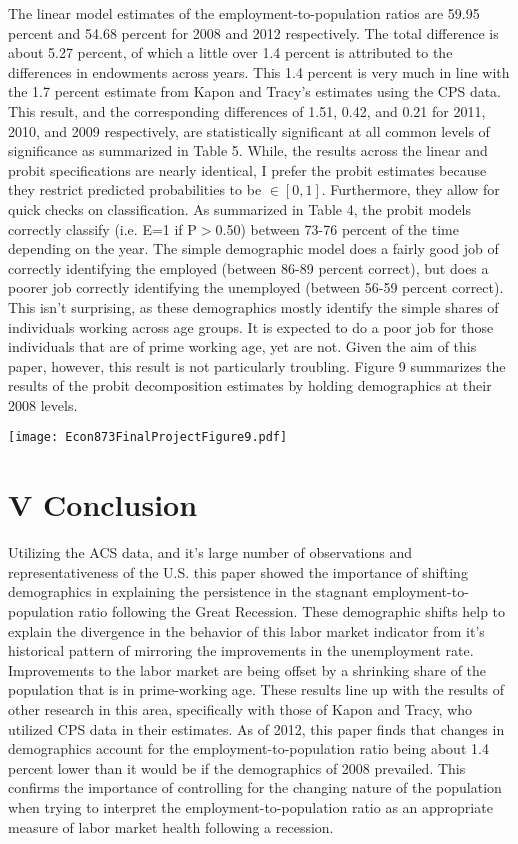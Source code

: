 \documentclass[11pt]{article}
\theoremstyle{definition}
\begin{document}
The linear model estimates of the employment-to-population ratios are 59.95 percent and 54.68 percent for 2008 and 2012 respectively.  The total difference is about 5.27 percent, of which a little over 1.4 percent is attributed to the differences in endowments across years.  This 1.4 percent is very much in line with the 1.7 percent estimate from Kapon and Tracy's estimates using the CPS data.  This result, and the corresponding differences of 1.51, 0.42, and 0.21 for 2011, 2010, and 2009 respectively, are statistically significant at all common levels of significance as summarized in Table 5.  While, the results across the linear and probit specifications are nearly identical, I prefer the probit estimates because they restrict predicted probabilities to be $\in[0,1]$.  Furthermore, they allow for quick checks on classification.  As summarized in Table 4, the probit models correctly classify (i.e. E=1 if P$>$0.50) between 73-76 percent of the time depending on the year.  The simple demographic model does a fairly good job of correctly identifying the employed (between 86-89 percent correct), but does a poorer job correctly identifying the unemployed (between 56-59 percent correct).  This isn't surprising, as these demographics mostly identify the simple shares of individuals working across age groups.  It is expected to do a poor job for those individuals that are of prime working age, yet are not.  Given the aim of this paper, however, this result is not particularly troubling.  Figure 9 summarizes the results of the probit decomposition estimates by holding demographics at their 2008 levels.  

\begin{center}
\texttt{[image: Econ873FinalProjectFigure9.pdf]}
\end{center}


\section*{V Conclusion}
\indent
\par
Utilizing the ACS data, and it's large number of observations and representativeness of the U.S. this paper showed the importance of shifting demographics in explaining the persistence in the stagnant employment-to-population ratio following the Great Recession.  These demographic shifts help to explain the divergence in the behavior of this labor market indicator from it's historical pattern of mirroring the improvements in the unemployment rate.  Improvements to the labor market are being offset by a shrinking share of the population that is in prime-working age.  These results line up with the results of other research in this area, specifically with those of Kapon and Tracy, who utilized CPS data in their estimates.  As of 2012, this paper finds that changes in demographics account for the employment-to-population ratio being about 1.4 percent lower than it would be if the demographics of 2008 prevailed.  This confirms the importance of controlling for the changing nature of the population when trying to interpret the employment-to-population ratio as an appropriate measure of labor market health following a recession.
\end{document}

